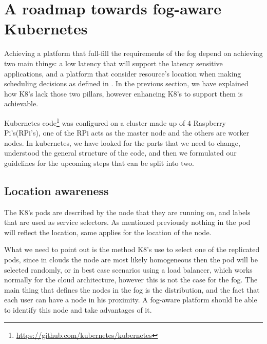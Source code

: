 \documentclass[letterpaper,twocolumn,10pt]{article}
\begin{document}
\section{A roadmap towards fog-aware Kubernetes}\label{sec:road}

Achieving a platform that full-fill the requirements of the fog depend on achieving two main things: a low latency that will support the latency sensitive applications, and a platform that consider resource's location when making scheduling decisions as defined in \cite{Bonomi:2012:FCR:2342509.2342513}. In the previous section, we have explained how K8's lack those two pillars, however enhancing K8's to support them is achievable.

Kubernetes code\footnote{\url{https://github.com/kubernetes/kubernetes}} was configured on a cluster made up of 4 Raspberry Pi's(RPi's), one of the RPi acts as the master node and the others are worker nodes. In kubernetes, we have looked for the parts that we need to change, understood the general structure of the code, and then we formulated our guidelines for the upcoming steps that can be split into two. 
 
\subsection{Location awareness}

The K8's pods are described by the node that they are running on, and labels that are used as service selectors. As mentioned previously nothing in the pod will reflect the location, same applies for the location of the node. 

What we need to point out is the method K8's use to select one of the replicated pods, since in clouds the node are most likely homogeneous then the pod will be selected randomly, or in best case scenarios using a load balancer, which works normally for the cloud architecture, however this is not the case for the fog. The main thing that defines the nodes in the fog is the distribution, and the fact that each user can have a node in his proximity. A fog-aware platform should be able to identify this node and take advantages of it. 
\end{document}
